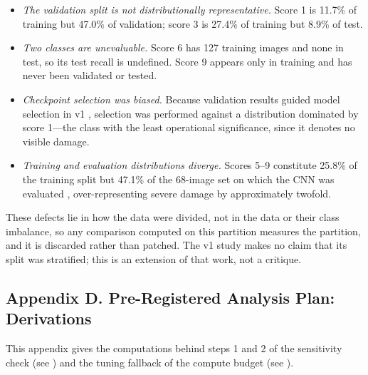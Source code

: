 \documentclass{icsthesis}
\newcommand{\secref}[1]{\textit{\nameref{#1}}}
\begin{document}
\begin{mainmatter}
				\begin{itemize}
					\item \textit{The validation split is not distributionally representative.}
						Score 1 is 11.7\% of training but 47.0\% of validation; score 3 is
						27.4\% of training but 8.9\% of test.
					\item \textit{Two classes are unevaluable.} Score 6 has 127 training images
						and none in test, so its test recall is undefined. Score 9 appears only
						in training and has never been validated or tested.
					\item \textit{Checkpoint selection was biased.} Because validation results
						guided model selection in v1 \citep{casasola2026}, selection was
						performed against a distribution dominated by score 1---the class with
						the least operational significance, since it denotes no visible damage.
					\item \textit{Training and evaluation distributions diverge.} Scores 5--9
						constitute 25.8\% of the training split but 47.1\% of the 68-image set
						on which the CNN was evaluated \citep{casasola2026}, over-representing
						severe damage by approximately twofold.
				\end{itemize}

				These defects lie in how the data were divided, not in the data or their class
				imbalance, so any comparison computed on this partition measures the partition,
				and it is discarded rather than patched. The v1 study makes no claim that its
				split was stratified; this is an extension of that work, not a critique.

			\subsection{Appendix D. Pre-Registered Analysis Plan: Derivations}\label{app:analysisplan}

				This appendix gives the computations behind steps 1 and 2 of the
				sensitivity check (see \secref{sec:sensitivity}) and the tuning fallback
				of the compute budget (see \secref{sec:tuning}).


\end{mainmatter}
\end{document}
